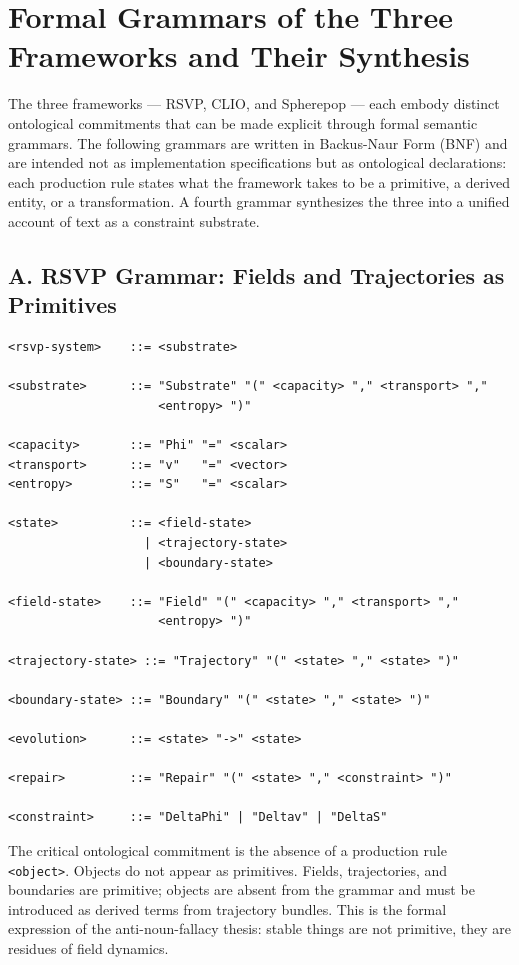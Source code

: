 \documentclass[12pt,a4paper]{article}
\begin{document}
\appendix

\section{Formal Grammars of the Three Frameworks and Their Synthesis}
\label{app:grammars}

The three frameworks --- RSVP, CLIO, and Spherepop --- each embody distinct ontological commitments that can be made explicit through formal semantic grammars. The following grammars are written in Backus-Naur Form (BNF) and are intended not as implementation specifications but as ontological declarations: each production rule states what the framework takes to be a primitive, a derived entity, or a transformation. A fourth grammar synthesizes the three into a unified account of text as a constraint substrate.

\subsection*{A. RSVP Grammar: Fields and Trajectories as Primitives}

\begin{verbatim}
<rsvp-system>    ::= <substrate>

<substrate>      ::= "Substrate" "(" <capacity> "," <transport> ","
                     <entropy> ")"

<capacity>       ::= "Phi" "=" <scalar>
<transport>      ::= "v"   "=" <vector>
<entropy>        ::= "S"   "=" <scalar>

<state>          ::= <field-state>
                   | <trajectory-state>
                   | <boundary-state>

<field-state>    ::= "Field" "(" <capacity> "," <transport> ","
                     <entropy> ")"

<trajectory-state> ::= "Trajectory" "(" <state> "," <state> ")"

<boundary-state> ::= "Boundary" "(" <state> "," <state> ")"

<evolution>      ::= <state> "->" <state>

<repair>         ::= "Repair" "(" <state> "," <constraint> ")"

<constraint>     ::= "DeltaPhi" | "Deltav" | "DeltaS"
\end{verbatim}

\noindent The critical ontological commitment is the absence of a production rule \texttt{<object>}. Objects do not appear as primitives. Fields, trajectories, and boundaries are primitive; objects are absent from the grammar and must be introduced as derived terms from trajectory bundles. This is the formal expression of the anti-noun-fallacy thesis: stable things are not primitive, they are residues of field dynamics.
\end{document}
